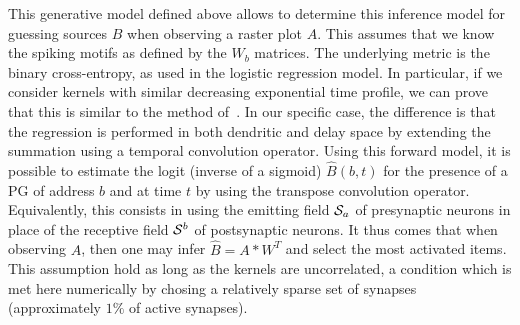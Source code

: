 \documentclass[default]{sn-jnl}%
\theoremstyle{thmstyleone}%
\theoremstyle{thmstyletwo}%
\theoremstyle{thmstylethree}%
\newcommand{\note}[1]{{\sethlcolor{yellow}\hl{#1}}}
\begin{document}
% 
This generative model defined above allows to determine this inference model for guessing sources $B$ when observing a raster plot $A$. This assumes that we know the spiking motifs as defined by the $W_b$ matrices. The underlying metric is the binary cross-entropy, as used in the logistic regression model. In particular, if we consider kernels with similar decreasing exponential time profile, we can prove that this is similar to the method of~\citet{berens_fast_2012}. In our specific case, the difference is that the regression is performed in both dendritic and delay space by extending the summation using a temporal convolution operator. Using this forward model, it is possible to estimate the logit (inverse of a sigmoid) $\hat{B}(b, t)$ for the presence of a PG of address $b$ and at time $t$ by using the transpose convolution operator. Equivalently, this consists in using the emitting field $\mathcal{S}_a$ of presynaptic neurons in place of the receptive field $\mathcal{S}^b$ of postsynaptic neurons. It thus comes that when observing $A$, then one may infer $\hat{B} = A \ast W^T$ and select the most activated items. This assumption hold as long as the kernels are uncorrelated, a condition which is met here numerically by chosing a relatively sparse set of synapses (approximately $1\%$ of active synapses).


%
%
%
\end{document}
